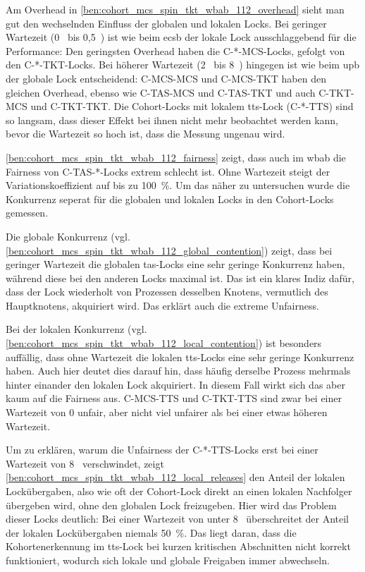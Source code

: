 Am Overhead in \autoref{ben:cohort_mcs_spin_tkt_wbab_112_overhead} sieht man gut
den wechselnden Einfluss der globalen und lokalen Locks.
Bei geringer Wartezeit (0~ bis 0,5~) ist wie beim \gls{ecsb}
der lokale Lock ausschlaggebend für die Performance:
Den geringsten Overhead haben die C-*-MCS-Locks,
gefolgt von den C-*-TKT-Locks.
Bei höherer Wartezeit (2~ bis 8~) hingegen ist wie beim \gls{upb}
der globale Lock entscheidend:
C-MCS-MCS und C-MCS-TKT haben den gleichen Overhead,
ebenso wie C-TAS-MCS und C-TAS-TKT
und auch C-TKT-MCS und C-TKT-TKT.
Die Cohort-Locks mit lokalem \gls{tts}-Lock (C-*-TTS) sind so langsam,
dass dieser Effekt bei ihnen nicht mehr beobachtet werden kann,
bevor die Wartezeit so hoch ist,
dass die Messung ungenau wird.

\autoref{ben:cohort_mcs_spin_tkt_wbab_112_fairness} zeigt,
dass auch im \gls{wbab} die Fairness von C-TAS-*-Locks extrem schlecht ist.
Ohne Wartezeit steigt der Variationskoeffizient auf bis zu 100~\%.
Um das näher zu untersuchen wurde die Konkurrenz seperat für die globalen und lokalen Locks
in den Cohort-Locks gemessen.

Die globale Konkurrenz (vgl. \autoref{ben:cohort_mcs_spin_tkt_wbab_112_global_contention}) zeigt,
dass bei geringer Wartezeit die globalen \gls{tas}-Locks eine sehr geringe Konkurrenz haben,
während diese bei den anderen Locks maximal ist.
Das ist ein klares Indiz dafür,
dass der Lock wiederholt von Prozessen desselben Knotens,
vermutlich des Hauptknotens,
akquiriert wird.
Das erklärt auch die extreme Unfairness.

Bei der lokalen Konkurrenz (vgl. \autoref{ben:cohort_mcs_spin_tkt_wbab_112_local_contention}) ist besonders auffällig,
dass ohne Wartezeit die lokalen \gls{tts}-Locks eine sehr geringe Konkurrenz haben.
Auch hier deutet dies darauf hin,
dass häufig derselbe Prozess mehrmals hinter einander den lokalen Lock akquiriert.
In diesem Fall wirkt sich das aber kaum auf die Fairness aus.
C-MCS-TTS und C-TKT-TTS sind zwar bei einer Wartezeit von 0 unfair,
aber nicht viel unfairer
als bei einer etwas höheren Wartezeit.

Um zu erklären,
warum die Unfairness der C-*-TTS-Locks erst bei einer Wartezeit von 8~ verschwindet,
zeigt \autoref{ben:cohort_mcs_spin_tkt_wbab_112_local_releases} den Anteil der lokalen Lockübergaben,
also wie oft der Cohort-Lock direkt an einen lokalen Nachfolger übergeben wird,
ohne den globalen Lock freizugeben.
Hier wird das Problem dieser Locks deutlich:
Bei einer Wartezeit von unter 8~
überschreitet der Anteil der lokalen Lockübergaben niemals 50~\%.
Das liegt daran,
dass die Kohortenerkennung im \gls{tts}-Lock bei kurzen kritischen Abschnitten nicht korrekt funktioniert,
wodurch sich lokale und globale Freigaben immer abwechseln.

